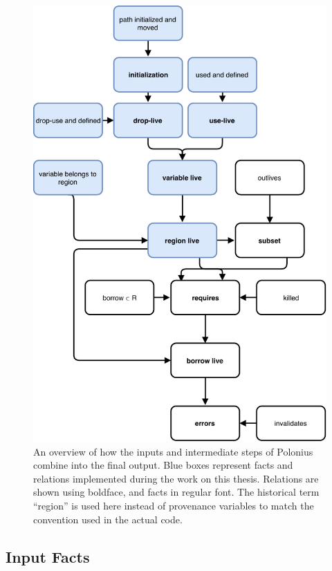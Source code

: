 \documentclass[11pt,a4paper,twoside,openany]{report}
\begin{document}
\begin{figure}
  \includegraphics[width=0.9\linewidth]{Graphs/polonius-overview}
  \caption[Flowchart of the Polonius Inputs and Outputs]{An overview of how the
    inputs and intermediate steps of Polonius combine into the final output.
    Blue boxes represent facts and relations implemented during the work on this
    thesis. Relations are shown using boldface, and facts in regular font. The
    historical term ``region'' is used here instead of provenance variables to
    match the convention used in the actual code.}
  \label{fig:polonius-overview}
\end{figure}

\subsection{Input Facts}
\label{sec:input-facts}
\end{document}
